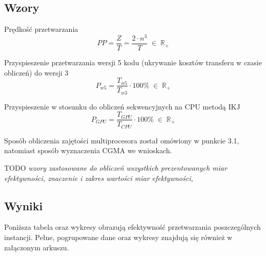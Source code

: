 \documentclass[12pt,a4paper]{article}
\begin{document}
\subsection{Wzory}

Prędkość przetwarzania
\begin{equation}
PP = \frac{Z}{T} = \frac{2 \cdot n^3}{T} \; \in \; \mathbb{R}_+
\end{equation}

Przyspieszenie przetwarzania wersji 5 kodu (ukrywanie kosztów transferu w czasie obliczeń) do wersji 3
\begin{equation}
P_{w5} = \frac{T_{w5}}{T_{w3}} \cdot 100\% \; \in \; \mathbb{R}_+
\end{equation}

Przyspieszenie w stosunku do obliczeń sekwencyjnych na CPU metodą IKJ
\begin{equation}
P_{GPU} = \frac{T_{GPU}}{T_{CPU}} \cdot 100\% \; \in \; \mathbb{R}_+
\end{equation}

Sposób obliczenia zajętości multiprocesora został omówiony w punkcie 3.1, natomiast sposób wyznaczenia CGMA we wnioskach.

TODO
\textit{wzory zastosowane do obliczeń wszystkich prezentowanych miar efektywności, znaczenie i zakres wartości
miar efektywności,}

\subsection{Wyniki}

Poniższa tabela oraz wykresy obrazują efektywność przetwarzania poszczególnych instancji. Pełne, pogrupowane dane oraz wykresy znajdują się również w załączonym arkuszu.
\end{document}
